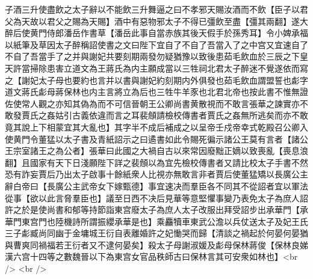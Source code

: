子酒三升使盡飲之太子辭以不能飲三升舞逼之曰不孝邪天賜汝酒而不飲【臣子以君父為天故以君父之賜為天賜】酒中有惡物邪太子不得已彊飲至盡【彊其兩翻】遂大醉后使黄門侍郎潘岳作書草【潘岳此事自當赤族其後天假手於孫秀耳】令小婢承福以紙筆及草因太子醉稱詔使書之文曰陛下宜自了不自了吾當入了之中宫又宜速自了不自了吾當手了之并與謝妃共要刻期兩發勿疑猶豫以致後患茹毛飲血於三辰之下皇天許當掃除患害立道文為王蔣氏為内主願成當以三牲祠北君太子醉迷不覺遂依而寫之【謝妃太子母也要約也言并以書與謝妃約刻期内外俱發也茹毛飲血謂盟誓也虨字道文蔣氏虨母蔣保林也内主言將立為后也三牲牛羊豕也北君北帝也按此書不惟無證佐使常人觀之亦知其偽為而不可信晉朝王公卿尚書黄散視而不敢言張華之諫實亦不敢發賈氏之姦姑引古義依違而言之耳裴頠請檢校傳書者賈氏之姦無所逃矣而亦不敢竟其說上下相蒙宜其大亂也】其字半不成后補成之以呈帝壬戍帝幸式乾殿召公卿入使黄門令董猛以太子書及青紙詔示之曰遹書如此令賜死徧示諸公王莫有言者【諸公王宗室諸王之為公者】張華曰此國之大禍自古以來常因廢黜正嫡以致喪亂【喪息浪翻】且國家有天下日淺願陛下詳之裴頠以為宜先檢校傳書者又請比校太子手書不然恐有詐妄賈后乃出太子啟事十餘紙衆人比視亦無敢言非者賈后使董猛矯以長廣公主辭白帝曰【長廣公主武帝女下嫁甄德】事宜速决而羣臣各不同其不從詔者宜以軍法從事【欲以此言脅羣臣也】議至日西不决后見華等意堅懼事變乃表免太子為庶人詔許之於是使尚書和郁等持節詣東宫廢太子為庶人太子改服出拜受詔步出承華門【承華門東宫門也陸機詩所謂振纓承華是也】乘麤犢車東武公澹以兵仗送太子及妃王氏三子虨臧尚同幽于金墉城王衍自表離婚許之妃慟哭而歸【清談之禍起於何晏何晏猶與曹爽同禍福若王衍者又不逮何晏矣】殺太子母謝淑媛及虨母保林蔣俊【保林良娣漢六宫十四等之數魏晉以下為東宫女官品秩師古曰保林言其可安衆如林也】<br />
<br />
